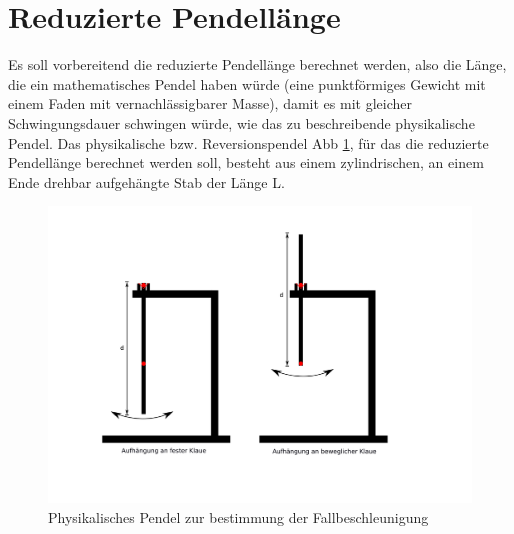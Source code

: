 \section{Reduzierte Pendellänge}

Es soll vorbereitend die reduzierte Pendellänge berechnet werden, also die Länge, die ein mathematisches Pendel haben würde (eine punktförmiges Gewicht mit einem Faden mit vernachlässigbarer Masse), damit es mit gleicher Schwingungsdauer schwingen würde, wie das zu beschreibende physikalische Pendel. Das physikalische bzw. Reversionspendel Abb \ref{fig:Versuch 1.2}, für das die reduzierte Pendellänge berechnet werden soll, besteht aus einem zylindrischen, an einem Ende drehbar aufgehängte Stab der Länge L.

\begin{figure}
    \centering
    \includegraphics[scale=0.8]{Pendel/Protokoll/fig/Versuch 1.2.png}
    \caption{Physikalisches Pendel zur bestimmung der Fallbeschleunigung}
    \label{fig:Versuch 1.2}
\end{figure}

